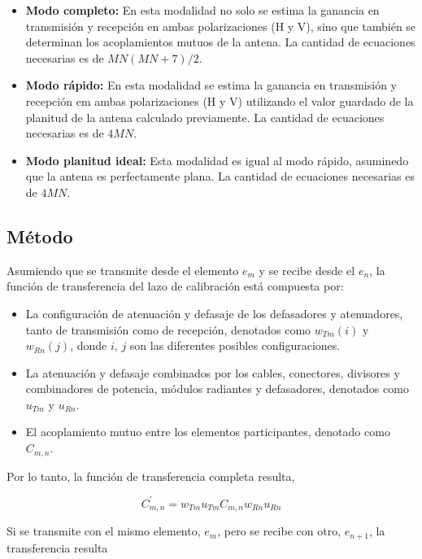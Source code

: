 \begin{itemize}
	\item \textbf{Modo completo:} En esta modalidad no solo se estima la ganancia en transmisión y recepción en ambas
		polarizaciones (H y V), sino que también se determinan los acoplamientos mutuos de la antena. La cantidad de ecuaciones necesarias es
		de $MN(MN + 7)/2$.
	\item \textbf{Modo rápido:} En esta modalidad se estima la ganancia en transmisión y recepción em ambas polarizaciones
		(H y V) utilizando el valor guardado de la planitud de la antena calculado previamente. La cantidad de ecuaciones necesarias
		es de $4MN$.
	\item \textbf{Modo planitud ideal:} Esta modalidad es igual al modo rápido, asuminedo que la antena es perfectamente plana.
		La cantidad de ecuaciones necesarias es de $4MN$.
\end{itemize}


\subsection{Método}

Asumiendo que se transmite desde el elemento $e_m$ y se recibe desde el $e_n$, la función de transferencia del lazo de
calibración está compuesta por:

\begin{itemize}
	\item La configuración de atenuación y defasaje de los defasadores y atenuadores, tanto de transmisión como de recepción,
		denotados como $w_{Tm}(i)$ y $w_{Rn}(j)$, donde $i$, $j$ son las diferentes posibles configuraciones.
	\item La atenuación y defasaje combinados por los cables, conectores, divisores y combinadores de potencia, módulos radiantes
		y defasadores, denotados como $u_{Tm}$ y $u_{Rn}$.
	\item El acoplamiento mutuo entre los elementos participantes, denotado como $C_{m, n}$.
\end{itemize}

Por lo tanto, la función de transferencia completa resulta,

\begin{equation}
	C^{'}_{m,n} = w_{Tm} u_{Tm} C_{m,n} w_{Rn} u_{Rn}
	\label{eq:transfer_mn}
\end{equation}

Si se transmite con el mismo elemento, $e_m$, pero se recibe con otro, $e_{n + 1}$, la transferencia resulta

